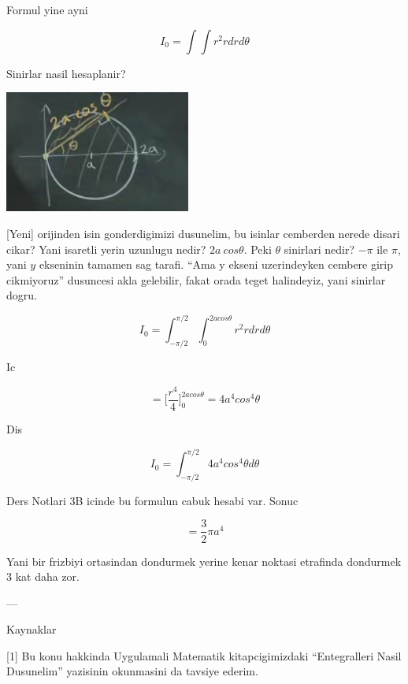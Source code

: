 \documentclass[12pt,fleqn]{article}
\begin{document}
Formul yine ayni

\[ I_0 = \int \int r^2 r dr d\theta \]

Sinirlar nasil hesaplanir? 

\includegraphics[height=4cm]{17_10.png}

[Yeni] orijinden isin gonderdigimizi dusunelim, bu isinlar cemberden nerede
disari cikar? Yani isaretli yerin uzunlugu nedir? $2a \ cos\theta$. Peki
$\theta$ sinirlari nedir? $-\pi$ ile $\pi$, yani $y$ ekseninin tamamen sag
tarafi. ``Ama y ekseni uzerindeyken cembere girip cikmiyoruz'' dusuncesi
akla gelebilir, fakat orada teget halindeyiz, yani sinirlar dogru. 

\[ I_0 = \int_{-\pi/2}^{\pi/2} \int_0^{2a cos\theta} r^2 r dr d\theta \]

Ic

\[ = \bigg[ \frac{r^4}{4} \bigg]_{0}^{2a cos\theta} =
4a^4 cos^4\theta
\]


Dis

\[ I_0 = \int_{-\pi/2}^{\pi/2} 4a^4 cos^4\theta d\theta \]

Ders Notlari 3B icinde bu formulun cabuk hesabi var. Sonuc

\[  = \frac{3}{2} \pi a^4 \]

Yani bir frizbiyi ortasindan dondurmek yerine kenar noktasi etrafinda
dondurmek 3 kat daha zor. 






















---

Kaynaklar

[1] Bu konu hakkinda Uygulamali Matematik kitapcigimizdaki ``Entegralleri
Nasil Dusunelim'' yazisinin okunmasini da tavsiye ederim. 
\end{document}
